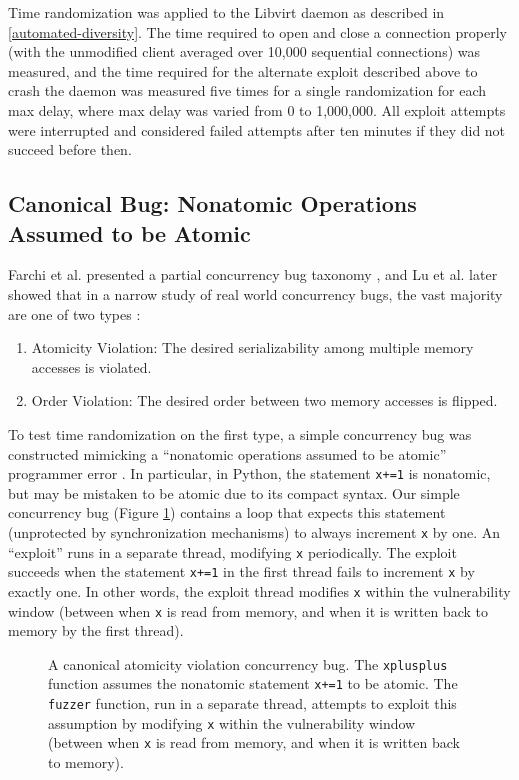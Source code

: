Time randomization was applied to the Libvirt daemon as described in \autoref{automated-diversity}.
The time required to open and close a connection properly (with the unmodified client averaged over 10,000 sequential connections) was measured, and the time required for the alternate exploit described above to crash the daemon was measured five times for a single randomization for each max delay, where max delay was varied from 0 to 1,000,000.
All exploit attempts were interrupted and considered failed attempts after ten minutes if they did not succeed before then.
\subsection{Canonical Bug: Nonatomic Operations Assumed to be Atomic}
Farchi et al. presented a partial concurrency bug taxonomy \cite{Farchi2003}, and Lu et al. later showed that in a narrow study of real world concurrency bugs, the vast majority are one of two types \cite{Lu2008}:
\begin{enumerate}
	\item Atomicity Violation: The desired serializability among multiple memory accesses is violated.
	\item Order Violation: The desired order between two memory accesses is flipped.
\end{enumerate}
To test time randomization on the first type, a simple concurrency bug was
constructed mimicking a ``nonatomic operations assumed to be atomic'' programmer error \cite{Farchi2003}.
In particular, in Python, the statement \texttt{x+=1} is nonatomic, but may be mistaken to be atomic due to its compact syntax.
Our simple concurrency bug (Figure \ref{fig_nonatomic}) contains a loop that expects this statement (unprotected by synchronization mechanisms) to always increment \texttt{x} by one.
An ``exploit'' runs in a separate thread, modifying \texttt{x} periodically.
The exploit succeeds when the statement \texttt{x+=1} in the first thread fails to increment \texttt{x} by exactly one.
In other words, the exploit thread modifies \texttt{x} within the vulnerability window (between when \texttt{x} is read from memory, and when it is written back to memory by the first thread).
\begin{figure}
	
	\caption{A canonical atomicity violation concurrency bug.  The \texttt{xplusplus} function assumes the nonatomic statement \texttt{x+=1} to be atomic.  The \texttt{fuzzer} function, run in a separate thread, attempts to exploit this assumption by modifying \texttt{x} within the vulnerability window (between when \texttt{x} is read from memory, and when it is written back to memory).}
	\label{fig_nonatomic}
\end{figure}

